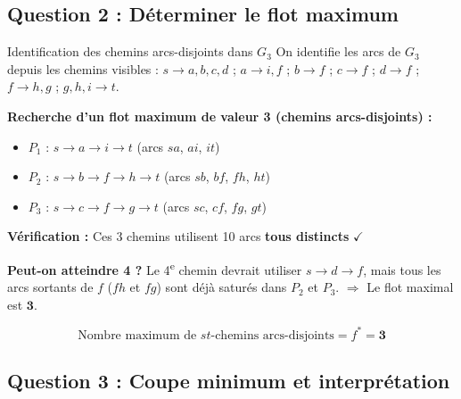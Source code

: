 \documentclass[12pt,a4paper]{article}
\begin{document}
\subsection{Question 2 : Déterminer le flot maximum}

\begin{etape}{Identification des chemins arcs-disjoints dans $G_3$}
On identifie les arcs de $G_3$ depuis les chemins visibles :
$s \to a,b,c,d$ ; $a \to i,f$ ; $b \to f$ ; $c \to f$ ; $d \to f$ ; $f \to h, g$ ; $g,h,i \to t$.

\medskip
\textbf{Recherche d'un flot maximum de valeur 3 (chemins arcs-disjoints) :}
\begin{itemize}
    \item $P_1$ : $s \to a \to i \to t$ \quad (arcs $sa$, $ai$, $it$)
    \item $P_2$ : $s \to b \to f \to h \to t$ \quad (arcs $sb$, $bf$, $fh$, $ht$)
    \item $P_3$ : $s \to c \to f \to g \to t$ \quad (arcs $sc$, $cf$, $fg$, $gt$)
\end{itemize}

\textbf{Vérification :} Ces 3 chemins utilisent 10 arcs \textbf{tous distincts} $\checkmark$

\medskip
\textbf{Peut-on atteindre 4 ?} Le 4\textsuperscript{e} chemin devrait utiliser $s \to d \to f$, mais tous les arcs sortants de $f$ ($fh$ et $fg$) sont déjà saturés dans $P_2$ et $P_3$. $\Rightarrow$ Le flot maximal est $\mathbf{3}$.
\end{etape}

\begin{resultat}
\[
\text{Nombre maximum de } st\text{-chemins arcs-disjoints} = f^* = \mathbf{3}
\]
\end{resultat}

\subsection{Question 3 : Coupe minimum et interprétation}
\end{document}
